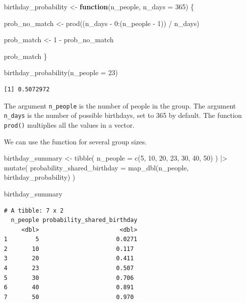 \documentclass[
  letterpaper,
  DIV=11,
  numbers=noendperiod]{scrreprt}
\newenvironment{Shaded}{\begin{snugshade}}{\end{snugshade}}
\newcommand{\AttributeTok}[1]{\textcolor[rgb]{0.40,0.45,0.13}{#1}}
\newcommand{\ControlFlowTok}[1]{\textcolor[rgb]{0.00,0.23,0.31}{\textbf{#1}}}
\newcommand{\DecValTok}[1]{\textcolor[rgb]{0.68,0.00,0.00}{#1}}
\newcommand{\FunctionTok}[1]{\textcolor[rgb]{0.28,0.35,0.67}{#1}}
\newcommand{\NormalTok}[1]{\textcolor[rgb]{0.00,0.23,0.31}{#1}}
\newcommand{\OtherTok}[1]{\textcolor[rgb]{0.00,0.23,0.31}{#1}}
\newcommand{\SpecialCharTok}[1]{\textcolor[rgb]{0.37,0.37,0.37}{#1}}
\begin{document}
\begin{Shaded}
\begin{Highlighting}[]
\NormalTok{birthday\_probability }\OtherTok{\textless{}{-}} \ControlFlowTok{function}\NormalTok{(n\_people, }\AttributeTok{n\_days =} \DecValTok{365}\NormalTok{) \{}
  
\NormalTok{  prob\_no\_match }\OtherTok{\textless{}{-}} \FunctionTok{prod}\NormalTok{((n\_days }\SpecialCharTok{{-}} \DecValTok{0}\SpecialCharTok{:}\NormalTok{(n\_people }\SpecialCharTok{{-}} \DecValTok{1}\NormalTok{)) }\SpecialCharTok{/}\NormalTok{ n\_days)}
  
\NormalTok{  prob\_match }\OtherTok{\textless{}{-}} \DecValTok{1} \SpecialCharTok{{-}}\NormalTok{ prob\_no\_match}
  
\NormalTok{  prob\_match}
\NormalTok{\}}

\FunctionTok{birthday\_probability}\NormalTok{(}\AttributeTok{n\_people =} \DecValTok{23}\NormalTok{)}
\end{Highlighting}
\end{Shaded}

\begin{verbatim}
[1] 0.5072972
\end{verbatim}

The argument \texttt{n\_people} is the number of people in the group.
The argument \texttt{n\_days} is the number of possible birthdays, set
to 365 by default. The function \texttt{prod()} multiplies all the
values in a vector.

We can use the function for several group sizes.

\begin{Shaded}
\begin{Highlighting}[]
\NormalTok{birthday\_summary }\OtherTok{\textless{}{-}} \FunctionTok{tibble}\NormalTok{(}
  \AttributeTok{n\_people =} \FunctionTok{c}\NormalTok{(}\DecValTok{5}\NormalTok{, }\DecValTok{10}\NormalTok{, }\DecValTok{20}\NormalTok{, }\DecValTok{23}\NormalTok{, }\DecValTok{30}\NormalTok{, }\DecValTok{40}\NormalTok{, }\DecValTok{50}\NormalTok{)}
\NormalTok{) }\SpecialCharTok{|\textgreater{}}
  \FunctionTok{mutate}\NormalTok{(}
    \AttributeTok{probability\_shared\_birthday =} \FunctionTok{map\_dbl}\NormalTok{(n\_people, birthday\_probability)}
\NormalTok{  )}

\NormalTok{birthday\_summary}
\end{Highlighting}
\end{Shaded}

\begin{verbatim}
# A tibble: 7 x 2
  n_people probability_shared_birthday
     <dbl>                       <dbl>
1        5                      0.0271
2       10                      0.117 
3       20                      0.411 
4       23                      0.507 
5       30                      0.706 
6       40                      0.891 
7       50                      0.970 
\end{verbatim}
\end{document}

